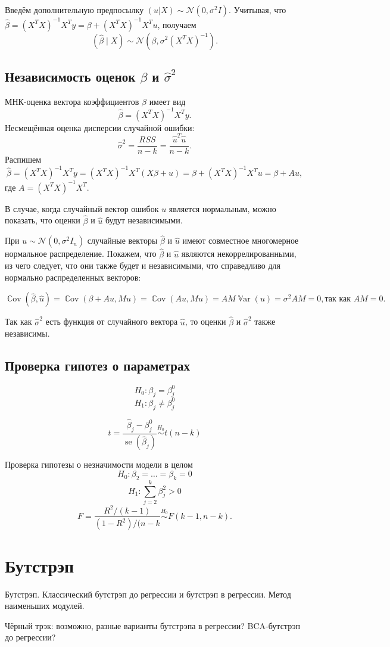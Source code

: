 \documentclass[12pt]{article}
\DeclareMathOperator{\Cov}{\mathbb{C}ov}
\DeclareMathOperator{\Var}{\mathbb{V}ar}
\DeclareMathOperator{\se}{se}
\newcommand{\cN}{\mathcal{N}}
\renewcommand{\b}{\beta}
\newcommand{\hb}{\hat{\beta}}
\renewcommand{\u}{u}
\newcommand{\hu}{\hat{u}}
\newcommand{\RSS}{RSS}
\begin{document}
Введём дополнительную предпосылку $(\u|X) \sim \cN(0, \sigma^2 I)$.
Учитывая, что $\hb = (X^T X)^{-1}X^T y = \b + (X^T X)^{-1}X^T u$, получаем
\[
(\hb \mid X) \sim \cN(\beta, \sigma^2(X^T X)^{-1}).
\]

\subsection{Независимость оценок $\b$ и $\hat\sigma^2$}
МНК-оценка вектора коэффициентов $\b$ имеет вид
\[
\hb = (X^TX)^{-1}X^{T}y.
\]
Несмещённая оценка дисперсии случайной ошибки:
\[
\hat\sigma^2 = \frac{\RSS}{n-k} = \frac{\hu^T \hu}{n-k}.
\]
Распишем
\[
\hb = (X^TX)^{-1}X^{T}y = (X^TX)^{-1}X^{T}(X\b+u) = \b + (X^TX)^{-1}X^{T}u = \b + Au,
\]
где $A = (X^TX)^{-1}X^{T}$.

В случае, когда случайный вектор ошибок $u$ является нормальным, можно показать, что оценки $\hb$ и $\hu$ будут независимыми.

При $u \sim \cN(0,\sigma^2I_n)$ случайные векторы $\hb$ и $\hu$ имеют совместное многомерное нормальное распределение. Покажем, что  $\hb$ и $\hu$ являются некоррелированными, из чего следует, что они также будет и независимыми, что справедливо для нормально распределенных векторов:

\[
\Cov(\hb,\hu) = \Cov(\b + Au, Mu) = \Cov(Au,Mu) = AM\Var(u) = \sigma^2AM = 0, \textbf{так как } AM=0.
\]

Так как $\hat\sigma^2$ есть функция от случайного вектора $\hu$, то оценки $\hb$ и $\hat\sigma^2$ также независимы.

\subsection{Проверка гипотез о параметрах}
\[
H_0: \b_j = \b_j^0
\]
\[
H_1: \b_j \neq \b_j^0
\]

\[
t = \frac{\hb_j - \b_j^0}{\se(\hb_j)} \overset{H_0}{\sim} t(n-k)
\]

Проверка гипотезы о незначимости модели в целом
\[
H_0: \b_2 = \dots =\b_k = 0
\]
\[
H_1: \sum_{j=2}^k \b_j^2 > 0
\]
\[
F = \frac{R^2 / (k-1)}{(1 - R^2)/(n-k} \overset{H_0}{\sim} F(k-1,n-k).
\]
\section{Бутстрэп}
Бутстрэп. Классический бутстрэп до регрессии и бутстрэп в регрессии. Метод наименьших модулей.

Чёрный трэк: возможно, разные варианты бутстрэпа в регрессии? BCA-бутстрэп до регрессии?
\end{document}
